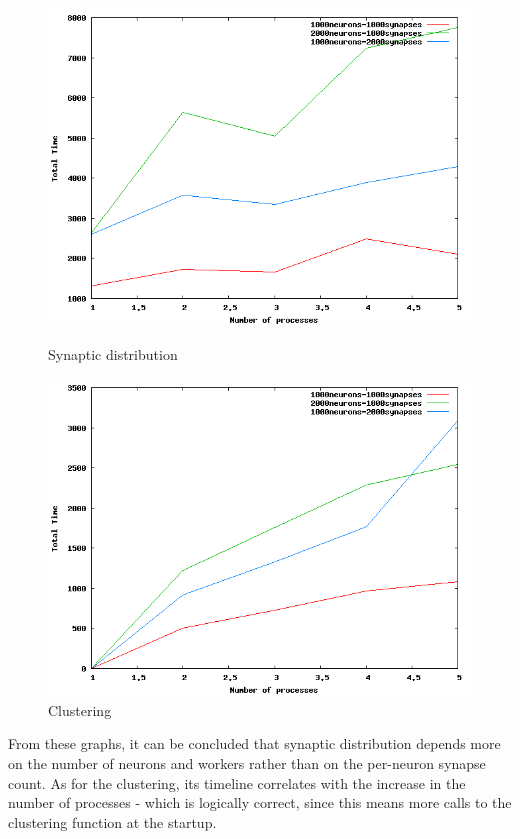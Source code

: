 \begin{figure}[ht]
\begin{minipage}[b]{0.5\linewidth}
\centering
\includegraphics[width=\textwidth]{images/evaluation/syndistr.png}
\caption{Synaptic distribution}
\label{fig:figure1}
\end{minipage}
\hspace{0.5cm}
\begin{minipage}[b]{0.5\linewidth}
\centering
\includegraphics[width=\textwidth]{images/evaluation/cluster.png}
\caption{Clustering}
\label{fig:figure2}
\end{minipage}
\end{figure}

From these graphs, it can be concluded that synaptic distribution depends more on the number of neurons and workers rather than on the per-neuron synapse count. As for the clustering, its timeline correlates with the increase in the number of processes - which is logically correct, since this means more calls to the clustering function at the startup.

